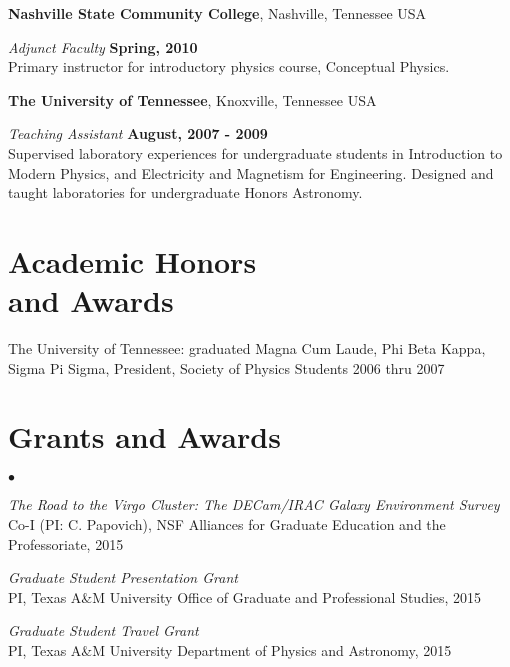 \documentclass[margin,line, 11pt]{res}
\newenvironment{list2}{
  \begin{list}{$\bullet$}{%
      \setlength{\itemsep}{0in}
      \setlength{\parsep}{0in} \setlength{\parskip}{0in}
      \setlength{\topsep}{0in} \setlength{\partopsep}{0in}
      \setlength{\leftmargin}{0.2in}}}{\end{list}}
\begin{document}
\begin{resume}
\textbf{Nashville State Community College}, Nashville, Tennessee USA
\vspace{-3mm}

\emph{Adjunct Faculty} \hfill \textbf{Spring, 2010}\\
Primary instructor for introductory physics course, Conceptual Physics.

\textbf{The University of Tennessee}, Knoxville, Tennessee USA
\vspace{-3mm}

\emph{Teaching Assistant} \hfill \textbf{August, 2007 - 2009}\\
Supervised laboratory experiences for undergraduate students in Introduction to Modern Physics, and Electricity and Magnetism for Engineering. Designed and taught laboratories for undergraduate Honors Astronomy.
\vspace*{-3mm}

\section{Academic Honors \\and Awards}
The University of Tennessee: graduated Magna Cum Laude, Phi Beta Kappa, Sigma
Pi Sigma, President, Society of Physics Students 2006 thru 2007

\section{Grants and Awards}
\begin{list2}
    \item \emph{The Road to the Virgo Cluster: The DECam/IRAC Galaxy Environment Survey}\\
	Co-I (PI: C. Papovich), NSF Alliances for Graduate Education and the Professoriate, 2015
	\item \emph{Graduate Student Presentation Grant}\\
	PI, Texas A\&M University Office of Graduate and Professional Studies, 2015
	\item \emph{Graduate Student Travel Grant}\\
	PI, Texas A\&M University Department of Physics and Astronomy, 2015
\end{list2}


\end{resume}
\end{document}
